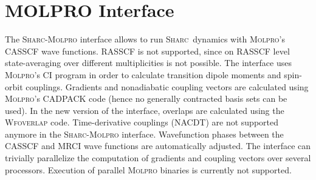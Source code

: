 \documentclass[a4paper,10pt,DIV=15,openany,twoside=false]{scrbook}
\newcommand{\sharc}{\textsc{Sharc}}
\newcommand{\todo}[1]{\textcolor{RL}{#1}}
\begin{document}
% 
% 
% 
% 




\section{MOLPRO Interface}\label{sec:int:molpro}

The \sharc-\textsc{Molpro} interface allows to run \sharc\ dynamics with \textsc{Molpro}'s CASSCF wave functions. RASSCF is not supported, since on RASSCF level state-averaging over different multiplicities is not possible. The interface uses \textsc{Molpro}'s CI program in order to calculate transition dipole moments and spin-orbit couplings. Gradients and nonadiabatic coupling vectors are calculated using \textsc{Molpro}'s CADPACK code (hence no generally contracted basis sets can be used). In the new version of the interface, overlaps are calculated using the \textsc{Wfoverlap} code. 
Time-derivative couplings (NACDT) are not supported anymore in the \sharc-\textsc{Molpro} interface.
Wavefunction phases between the CASSCF and MRCI wave functions are automatically adjusted.
The interface can trivially parallelize the computation of gradients and coupling vectors over several processors.
\todo{Execution of parallel \textsc{Molpro} binaries is currently not supported.}
\end{document}

